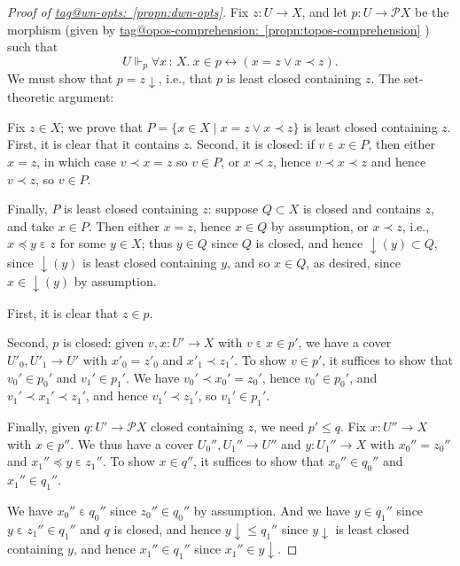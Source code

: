 \documentclass{amsart}
\makeatletter
\newcommand\dwnfn{{\downarrow}}
\newcommand\dwn{\mathpunct{\downarrow}}
\newcommand\ein{\mathrel{\varepsilon}}
\newcommand\pow{\mathcal{P}}
\newcommand\set[2][]{#1\{ #2 #1\}}
\newcommand\tolon{{\,:\,}}
\newcommand\tot{\leftrightarrow}
\newcommand\tagword[1]{\csname tag@#1\endcsname}
\def\label@tag#1:#2\@nil{#1}
\newcommand\labeltag[1]{\label@tag#1:\@nil}
\newcommand\jref[1]{%
  \texorpdfstring%
    {\hyperref[#1]{\tagword{\labeltag{#1}}~\ref*{#1}}}%
    {\tagword{\labeltag{#1}}~\ref*{#1}}%
}
\theoremstyle{definition}
\theoremstyle{remark}
\theoremstyle{plainwithref}
\newenvironment{settybox}{\begin{tcolorbox}[colback=blue!20,breakable%
    ,enhanced%
    ,sharp corners%
    ,frame hidden%
    ,boxsep=0pt
    ,left=5pt,right=5pt,top=5pt,bottom=5pt
    ,enlarge left by=-5pt,width=\linewidth+10pt
    ,enlarge top by=5pt,enlarge bottom by=5pt
    ,before skip balanced=0pt,after skip balanced=0pt
    ]}{\end{tcolorbox}}
\makeatother
\begin{document}
\begin{proof}[Proof of \jref{propn:dwn-opts}] \label{proof:dwn-opts}
  Fix \( z \colon U \to X \), and let \( p \colon U \to \pow X \) be the morphism (given by \jref{propn:topos-comprehension}) such that
  \[
    U \Vdash_{p} \forall x \tolon X.\ x \in p \tot (x = z \vee x \prec z).
  \]
  We must show that \( p = z \dwn \), i.e., that \( p \) is least closed containing \( z. \)
  The set-theoretic argument:
  \begin{settybox}
    Fix \( z \in X \); we prove that \( P = \set{ x \in X \mid x = z \vee x \prec z } \) is least closed containing \( z \).
    First, it is clear that it contains \( z \).
    Second, it is closed: if \( v \ein x \in P \), then either \( x = z \), in which case \( v \prec x = z \) so \( v \in P \), or \( x \prec z \), hence \( v \prec x \prec z \) and hence \( v \prec z \), so \( v \in P \).

    Finally, \( P \) is least closed containing \( z \): suppose \( Q \subset X \) is closed and contains \( z \), and take \( x \in P \).
    Then either \( x = z \), hence \( x \in Q \) by assumption, or \( x \prec z \), i.e., \( x \preceq y \ein z \) for some \( y \in X \); thus \( y \in Q \) since \( Q \) is closed, and hence \( \dwnfn(y) \subset Q \), since \( \dwnfn(y) \) is least closed containing \( y \), and so \( x \in Q \), as desired, since \( x \in \dwnfn(y) \) by assumption.
  \end{settybox}
  First, it is clear that \( z \in p \).

  Second, \( p \) is closed: given \( v,x \colon U' \to X \) with \( v \ein x \in p' \), we have a cover \( U'_0,U'_1 \to U' \) with \( x'_0 = z'_0 \) and \( x'_1 \prec z_1' \).
  To show \( v \in p' \), it suffices to show that \( v_0' \in p_0' \) and \( v_1' \in p_1' \).
  We have \( v_0' \prec x_0' = z_0' \), hence \( v_0' \in p_0' \), and \( v_1' \prec x_1' \prec z_1' \), and hence \( v_1' \prec z_1' \), so \( v_1' \in p_1' \).

  Finally, given \( q \colon U' \to \pow X \) closed containing \( z \), we need \( p' \le q \).
  Fix \( x \colon U'' \to X \) with \( x \in p'' \).
  We thus have a cover \( U_0'', U_1'' \to U'' \) and \( y \colon U_1'' \to X \) with \( x_0'' = z_0'' \) and \( x_1'' \preceq y \ein z_1'' \).
  To show \( x \in q'' \), it suffices to show that \( x_0'' \in q_0'' \) and \( x_1'' \in q_1'' \).

  We have \( x_0'' \ein q_0'' \) since \( z_0'' \in q_0'' \) by assumption.
  And we have \( y \in q_1'' \) since \( y \ein z_1'' \in q_1'' \) and \( q \) is closed, and hence \( y \dwn \le q_1'' \) since \( y \dwn \) is least closed containing \( y \), and hence \( x_1'' \in q_1'' \) since \( x_1'' \in y \dwn \).
\end{proof}
\end{document}
